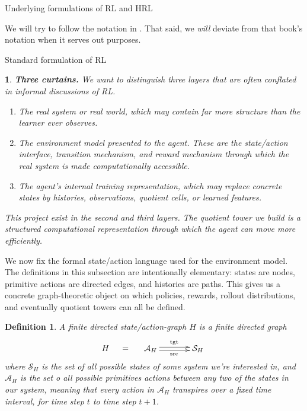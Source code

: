 \documentclass[11pt]{article}
\newtheorem{definition}[subsubsection]{Definition}
\newtheorem{ermark}[subsubsection]{}
\begin{document}
\begin{section}{Underlying formulations of RL and HRL}

We will try to follow the notation in \cite[pp. xix-xxii]{SBRL}. That said, we {\em will} deviate from that book's notation when it serves out purposes.

\begin{subsection}{Standard formulation of RL}

\begin{ermark}
{\bf Three curtains.}
\normalfont
We want to distinguish three layers that are often conflated in informal discussions of RL. 
\begin{enumerate}
\item
The {\em real system} or {\em real world}, which may contain far more structure than the learner ever observes. 
\item
The {\em environment model} presented to the agent. These are the state/action interface, transition mechanism, and reward mechanism through which the real system is made computationally accessible. 
\item
{\em The agent's internal training representation}, which may replace concrete states by histories, observations, quotient cells, or learned features. 
\end{enumerate}
This project exist in the second and third layers. The quotient tower we build is a structured computational representation through which the agent can move more efficiently.
\end{ermark}

We now fix the formal state/action language used for the environment model. The definitions in this subsection are intentionally elementary: states are nodes, primitive actions are directed edges, and histories are paths. This gives us a concrete graph-theoretic object on which policies, rewards, rollout distributions, and eventually quotient towers can all be defined.
 
\begin{definition}
\normalfont
A finite directed {\em state/action-graph} $H$ is a finite directed graph
\begin{equation}\label{eq:H src tgt}
H\;\quad=\quad\;
\begin{xy}
(0,0)*+{\mathcal{A}_{H}}="1";
(20,0)*+{\mathcal{S}_{H}}="2";
{\ar@<2pt>^{\text{tgt}} "1"; "2"}
{\ar@<-2pt>_{\text{src}} "1"; "2"}
\end{xy}
\end{equation}
where $\mathcal{S}_{H}$ is the set of all possible states of some system we're interested in, and $\mathcal{A}_{H}$ is the set o all possible primitives actions between any two of the states in our system, meaning that every action in $\mathcal{A}_{H}$ transpires over a fixed time interval, for time step $t$ to time step $t+1$.


\end{definition}
\end{subsection}
\end{section}
\end{document}
